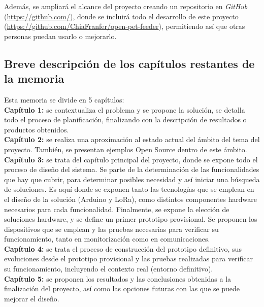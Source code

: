 \documentclass[12pt]{article}
\begin{document}
	\noindent Además, se ampliará el alcance del proyecto creando un repositorio en \textit{GitHub }(\url{https://github.com/}), donde se incluirá todo el desarrollo de este proyecto (\url{https://github.com/ChiaFranfer/open-pet-feeder}), permitiendo así que otras personas puedan usarlo o mejorarlo.
	
	\subsection[Breve descripción de los capítulos restantes de la memoria]{Breve descripción de los capítulos restantes de la memoria}
	
	\noindent Esta memoria se divide en 5 capítulos:
\\
	
	\noindent \textbf{Capítulo 1: }se contextualiza el problema y se propone la solución, se detalla todo el
proceso de planificación, finalizando con
la descripción de resultados o productos obtenidos.\\
	
	\noindent \textbf{Capítulo 2: }se realiza una aproximación al estado actual del ámbito del tema del
proyecto. También, se presentan ejemplos Open Source dentro de este ámbito.
\\
	
	\noindent \textbf{Capítulo 3:} se trata del capítulo principal del proyecto, donde se expone todo el
proceso de diseño del sistema. Se parte de la determinación de las funcionalidades que hay que cubrir, para determinar posibles necesidad y así iniciar una búsqueda de soluciones. Es aquí donde se exponen tanto las tecnologías que se
emplean en el diseño de la solución (Arduino y LoRa), como distintos componentes hardware necesarios para cada funcionalidad. Finalmente, se expone la elección de soluciones hardware, y se define un primer prototipo provisional. Se proponen los
dispositivos que se emplean y las pruebas necesarias para verificar su funcionamiento,
tanto en monitorización como en comunicaciones. \\
	
	\noindent \textbf{Capítulo 4: }se trata el proceso de construcción del prototipo definitivo, sus evoluciones desde el prototipo provisional y las
pruebas realizadas para verificar su funcionamiento, incluyendo el contexto real (entorno definitivo).
\\
	
	\noindent \textbf{Capítulo 5:} se proponen los resultados y las conclusiones obtenidas a la finalización del proyecto, así como las opciones futuras con las que se puede mejorar el diseño.\\
\end{document}
